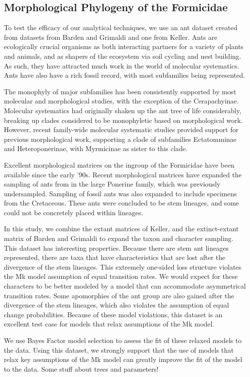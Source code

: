 \documentclass[]{article}
\begin{document}
\subsection{Morphological Phylogeny of the Formicidae}
To test the efficacy of our analytical techniques, we use an ant dataset created from datasets from Barden and Grimaldi and one from Keller.
Ants are ecologically crucial organisms as both interacting partners for a variety of plants and animals, and as shapers of the ecosystem via soil cycling and nest building.
As such, they have attracted much work in the world of molecular systematics.
Ants have also have a rich fossil record, with most subfamilies being represented. \par
The monophyly of major subfamilies has been consistently supported by most molecular and morphological studies, with the exception of the Cerapachyinae. 
Molecular systematics had originally shaken up the ant tree of life considerably, breaking up clades considered to be monophyletic based on morphological work.
However, recent family-wide molecular systematic studies provided support for previous morphological work, supporting a clade of subfamilies Ectatomminae and Heteroponerinae, with Myrmicinae as sister to this clade. \par
Excellent morphological matrices on the ingroup of the Formicidae have been available since the early '90s. 
Recent morphological matrices have expanded the sampling of ants from in the large Ponerine family, which was previously undersampled.
Sampling of fossil ants was also expanded to include specimens from the Cretaceous.
These ants were concluded to be stem lineages, and some could not be concretely placed within lineages. \par
In this study, we combine the extant matrices of Keller, and the extinct-extant matrix of Barden and Grimaldi to expand the taxon and character sampling.  
This dataset has interesting properties.
Because there are stem ant lineages represented, there are taxa that have characteristics that are lost after the divergence of the stem lineages.
This extremely one-sided loss structure violates the Mk model assumption of equal transition rates. 
We would expect for these characters to be better modeled by a model that can accommodate asymmetrical transition rates.
Some apomorphies of the ant group are also gained after the divergence of the stem lineages, which also violates the assumption of equal change probabilities.
Because of these model violations, this dataset is an excellent test case for models that relax assumptions of the Mk model. \par
We use Bayes Factor model selection to assess the fit of these relaxed models to the data.
Using this dataset, we strongly support that the use of models that relax key assumptions of the Mk model can greatly improve the fit of the model to the data.
Some stuff about trees and parameters!
\end{document}
